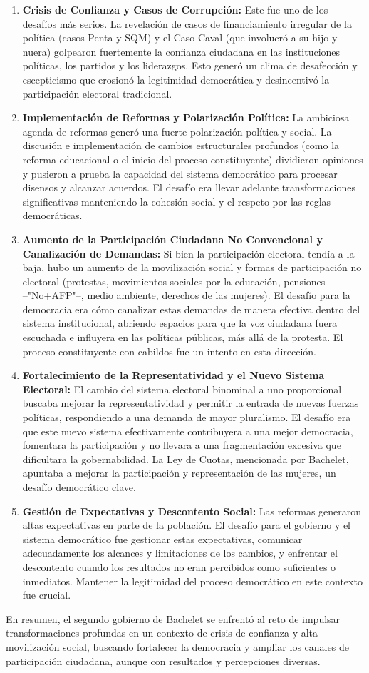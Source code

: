 \documentclass[11pt]{article}
\begin{document}
\begin{enumerate}[label=\arabic*., wide, labelwidth=!, labelindent=0pt]
    \item \textbf{Crisis de Confianza y Casos de Corrupción:}
    Este fue uno de los desafíos más serios. La revelación de casos de financiamiento irregular de la política (casos Penta y SQM) y el Caso Caval (que involucró a su hijo y nuera) golpearon fuertemente la confianza ciudadana en las instituciones políticas, los partidos y los liderazgos. Esto generó un clima de desafección y escepticismo que erosionó la legitimidad democrática y desincentivó la participación electoral tradicional.

    \item \textbf{Implementación de Reformas y Polarización Política:}
    La ambiciosa agenda de reformas generó una fuerte polarización política y social. La discusión e implementación de cambios estructurales profundos (como la reforma educacional o el inicio del proceso constituyente) dividieron opiniones y pusieron a prueba la capacidad del sistema democrático para procesar disensos y alcanzar acuerdos. El desafío era llevar adelante transformaciones significativas manteniendo la cohesión social y el respeto por las reglas democráticas.

    \item \textbf{Aumento de la Participación Ciudadana No Convencional y Canalización de Demandas:}
    Si bien la participación electoral tendía a la baja, hubo un aumento de la movilización social y formas de participación no electoral (protestas, movimientos sociales por la educación, pensiones --"No+AFP"--, medio ambiente, derechos de las mujeres). El desafío para la democracia era cómo canalizar estas demandas de manera efectiva dentro del sistema institucional, abriendo espacios para que la voz ciudadana fuera escuchada e influyera en las políticas públicas, más allá de la protesta. El proceso constituyente con cabildos fue un intento en esta dirección.

    \item \textbf{Fortalecimiento de la Representatividad y el Nuevo Sistema Electoral:}
    El cambio del sistema electoral binominal a uno proporcional buscaba mejorar la representatividad y permitir la entrada de nuevas fuerzas políticas, respondiendo a una demanda de mayor pluralismo. El desafío era que este nuevo sistema efectivamente contribuyera a una mejor democracia, fomentara la participación y no llevara a una fragmentación excesiva que dificultara la gobernabilidad. La Ley de Cuotas, mencionada por Bachelet, apuntaba a mejorar la participación y representación de las mujeres, un desafío democrático clave.

    \item \textbf{Gestión de Expectativas y Descontento Social:}
    Las reformas generaron altas expectativas en parte de la población. El desafío para el gobierno y el sistema democrático fue gestionar estas expectativas, comunicar adecuadamente los alcances y limitaciones de los cambios, y enfrentar el descontento cuando los resultados no eran percibidos como suficientes o inmediatos. Mantener la legitimidad del proceso democrático en este contexto fue crucial.
\end{enumerate}

En resumen, el segundo gobierno de Bachelet se enfrentó al reto de impulsar transformaciones profundas en un contexto de crisis de confianza y alta movilización social, buscando fortalecer la democracia y ampliar los canales de participación ciudadana, aunque con resultados y percepciones diversas.
\end{document}
